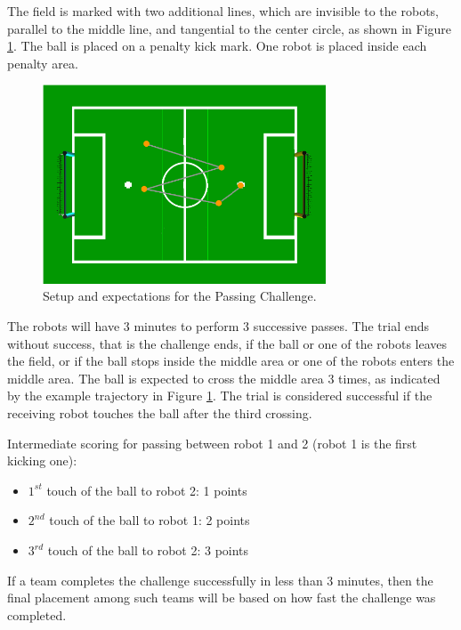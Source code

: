 \documentclass{article}
\begin{document}
The field is marked with two additional lines, which are invisible to the robots, parallel to the middle line, and tangential to the center circle, as shown in Figure \ref{fig:passingchallenge}. The ball is placed on a penalty kick mark.
One robot is placed inside each penalty area.

\begin{figure}[htbp]
 \centering
 \includegraphics[width=0.75\textwidth]{figures/nao_passingchallenge.png}
 \caption{Setup and expectations for the Passing Challenge.}
 \label{fig:passingchallenge}
\end{figure}

The robots will have 3 minutes to perform 3 successive passes. The trial ends without success, that is the challenge ends, if the ball or one of the robots leaves the field, or if the ball stops inside the middle area or one of the robots enters the middle area. The ball is expected to cross the middle area 3 times, as indicated by the example trajectory in Figure \ref{fig:passingchallenge}. The trial is considered successful if the receiving robot touches the ball after the third crossing.

Intermediate scoring for passing between robot 1 and 2 (robot 1 is the first kicking one):
\begin{itemize}
 \item $1^{st}$ touch of the ball to robot 2:  1 points
 \item $2^{nd}$ touch of the ball to robot 1:  2 points
 \item $3^{rd}$ touch of the ball to robot 2:  3 points
\end{itemize}

If a team completes the challenge successfully in less than 3 minutes, then the final placement among such teams will be based on how fast the challenge was completed.
\end{document}
